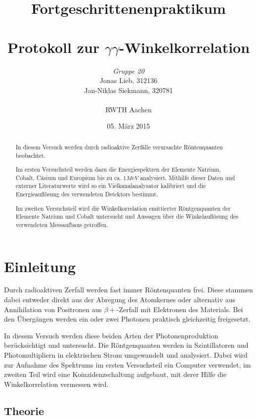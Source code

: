 \documentclass{../Misc/MontavonLaTeX/Montavon}
\date{05. März 2015}
\begin{document}
\title{Fortgeschrittenenpraktikum \\ \quad \\ Protokoll zur $\gamma\gamma$-Winkelkorrelation }
\author{\emph{Gruppe 20} \\  Jonas Lieb, 312136 \\ Jan-Niklas Siekmann, 320781 \\ \ \\  RWTH Aachen}
\maketitle
\begin{abstract}
In diesem Versuch werden durch radioaktive Zerfälle verursachte Röntenquanten beobachtet. 

Im ersten Versuchsteil werden dazu die Energiespektren der Elemente Natrium, Cobalt, Cäsium und Europium bis zu ca. $1 \unit{MeV}$ analysiert. Mithilfe dieser Daten und externer Literaturwerte wird so ein Vielkanalanalysator kalibriert und die Energieauflösung des verwendeten Detektors bestimmt.

Im zweiten Versuchsteil wird die Winkelkorrelation emittierter Röntgenquanten der Elemente Natrium und Cobalt untersucht und Aussagen über die Winkelauflösung des verwendeten Messaufbaus getroffen.
\end{abstract}
\newpage

\tableofcontents
\newpage

\section{Einleitung}

Durch radioaktiven Zerfall werden fast immer Röntenquanten frei. Diese stammen dabei entweder direkt aus der Abregung des Atomkernes oder alternativ aus Annihilation von Positronen aus $\beta+$-Zerfall mit Elektronen des Materials. Bei den Übergängen werden ein oder zwei Photonen praktisch gleichzeitig freigesetzt. 

In diesem Versuch werden diese beiden Arten der Photonenproduktion berücksichtigt und untersucht.
Die Röntgenquanten werden in Szintillatoren und Photomultipliern in elektrischen Strom umgewandelt und analysiert. Dabei wird zur Aufnahme des Spektrums im ersten Versuchsteil ein Computer verwendet, im zweiten Teil wird eine Koinzidenzschaltung aufgebaut, mit derer Hilfe die Winkelkorrelation vermessen wird.

\subsection{Theorie}
\end{document}
